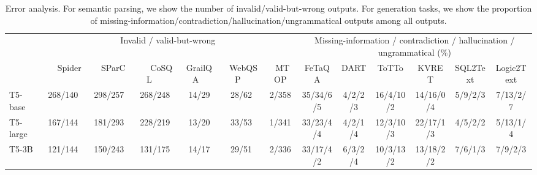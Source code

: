 \iffalse
\begin{figure}[t]
\centering
    \subfigure[FeTaQA]{
        \texttt{[image: figures/human\_and\_error/FeTaQA-human.pdf]}
    }
    \subfigure[DART]{
        \texttt{[image: figures/human\_and\_error/DART-human.pdf]}
    }
    \subfigure[ToTTo]{
        \texttt{[image: figures/human\_and\_error/ToTTo-human.pdf]}
    }
    \subfigure[KVRET]{
        \texttt{[image: figures/human\_and\_error/KVRET-human.pdf]}
    }
    \subfigure[SQL2Text]{
        \texttt{[image: figures/human\_and\_error/SQL2Text-human.pdf]}
    }
    \subfigure[Logic2Text]{
        \texttt{[image: figures/human\_and\_error/Logic2Text-human.pdf]}
    }
\caption{\label{fig:human-eval} Development set performance measured by automatic metrics and human for generation tasks. Generation metrics do not always reflect human evaluation. Larger models are not always better. Human evaluation statistical test: 1) on FeTaQA and SQL2Text, we have $p<0.05$ for ``the rank-1 model is better than the rank-2 model''; 2) on FeTaQA, KVRET, and Logic2Text, we have $p<0.05$ for ``the rank-2 model is better than the rank-3 model''.
\ziyu{larger font size in figures?}
\tao{take too much space to show a non-key discussion}
}
\end{figure}
\fi\iffalse
\begin{table*}[t]
	\centering
	\small
	\begin{adjustbox}{width=\linewidth}
	\begin{tabular}{@{}l@{}c@{}c@{}c@{}c@{}c@{}ccccccc@{}}
			\toprule
			& \multicolumn{6}{c}{Invalid / valid-but-wrong} & \multicolumn{6}{c}{Missing-information / contradiction / hallucination / ungrammatical (\%)} \\ 
		    \cmidrule(lr){2-7} \cmidrule(l){8-13}
			& \ \ \  Spider \ \ \ & \ \ SParC \ \ & \ \ \ CoSQL \ \ & GrailQA \ & \ WebQSP \ & \ MTOP & FeTaQA & DART & ToTTo & KVRET & SQL2Text & Logic2Text \\ 
			\midrule 
			T5-base       & 268/140 & 298/257 & 268/248 & 14/29 & 28/62 & 2/358 & 35/34/6/5 & 4/2/2/3 & 16/4/10/2 & 14/16/0/4 & 5/9/2/3 & 7/13/2/7 \\
			T5-large      & 167/144 & 181/293 & 228/219 & 13/20 & 33/53 & 1/341 & 33/23/4/4 & 4/2/1/4 & 12/3/10/3 & 22/17/1/3 & 4/5/2/2 & 5/13/1/4 \\
			T5-3B         & 121/144 & 150/243 & 131/175 & 14/17 & 29/51 & 2/336 & 33/17/4/2 & 6/3/2/4 & 10/3/13/2 & 13/18/2/2 & 7/6/1/3 & 7/9/2/3 \\ 
			\bottomrule
	\end{tabular}
	\end{adjustbox}
	\caption{Error analysis. For semantic parsing, we show the number of invalid/valid-but-wrong outputs. For generation tasks, we show the proportion of missing-information/contradiction/hallucination/ungrammatical outputs among all outputs.   }
	\label{tab:error_distribution}
\end{table*}
\fi 

